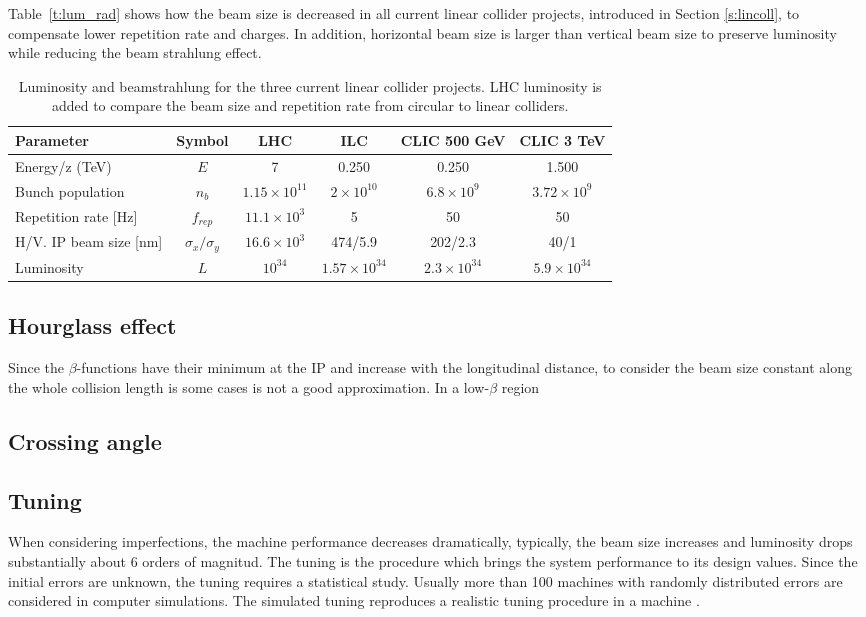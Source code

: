 Table~\ref{t:lum_rad} shows how the beam size is decreased in all current linear collider projects, introduced in Section \ref{s:lincoll}, to compensate lower repetition rate and charges. In addition, horizontal beam size is larger than vertical beam size to preserve luminosity while reducing the beam strahlung effect.\par
\begin{table}[h]
{\scriptsize
\centering
\begin{tabular}{l|c||c|c|c|c}\hline
Parameter & Symbol & LHC & ILC & CLIC 500 GeV& CLIC 3 TeV\\\hline\hline
Energy/z (TeV) & $E$& 7& 0.250 & 0.250 & 1.500\\
Bunch population & $n_b$ &$1.15\times10^{11}$&$2\times10^{10}$&$6.8\times10^9$&$3.72\times10^9$\\
Repetition rate [Hz] &$f_{rep}$& $11.1\times10^{3}$&5 &50&50\\
H/V. IP beam size [nm] & $\sigma_x/\sigma_y$&$16.6\times10^{3}$&474/5.9&202/2.3&40/1\\\hline
Luminosity &$L$& $10^{34}$ &$1.57\times10^{34}$ & $2.3\times10^{34}$&$5.9\times10^{34}$\\\hline
\end{tabular}\caption{Luminosity and beamstrahlung for the three current linear collider projects. LHC luminosity is added to compare the beam size and repetition rate from circular to linear colliders.}\label{t:beam_rad}
}
\end{table}

\subsection{Hourglass effect}
Since the $\beta$-functions have their minimum at the IP and increase with the longitudinal distance, to consider the beam size constant along the whole collision length is some cases is not a good approximation. In a low-$\beta$ region 
\subsection{Crossing angle}
\subsection{Tuning}
When considering imperfections, the machine performance decreases dramatically, typically, the beam size increases and luminosity drops substantially about 6 orders of magnitud. The tuning is the procedure which brings the system performance to its design values. Since the initial errors are unknown, the tuning requires a statistical study. Usually more than 100 machines with randomly distributed errors are considered in computer simulations. The simulated tuning reproduces a realistic tuning procedure in a machine \cite{GarciaMorales:1982827,Minty:629879}.\par
